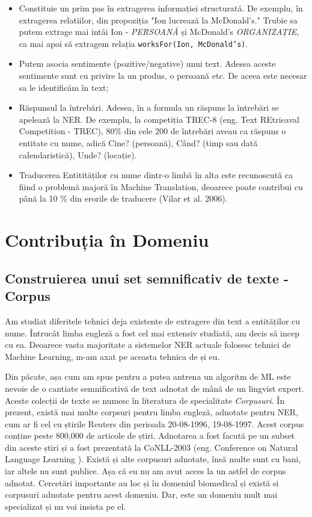 \begin{itemize}
\item Constituie un prim pas în extragerea informației structurată. De exemplu, în extragerea relatiilor, din propoziția "Ion lucrează la McDonald's." Trubie sa putem extrage mai intâi Ion - \textit{PERSOANĂ} și McDonald's \textit{ORGANIZAȚIE}, ca mai apoi să extragem relația \texttt{worksFor(Ion, McDonald's)}.
\item Putem asocia sentimente (pozitive/negative) unui text. Adesea aceste sentimente sunt cu privire la un produs, o persoană etc. De aceea este necesar sa le identificăm în text;
\item Răspunsul la întrebări. Adesea, în a formula un răspuns la întrebări se apelează la NER. De exemplu, la competiția TREC-8 (eng. Text REtrieaval Competition - TREC), 80\% din cele 200 de întrebări aveau ca răspuns o entitate cu nume, adică Cine? (persoană), Când? (timp sau dată calendaristică), Unde? (locație).\cite{trec8}
\item Traducerea Entitităților cu nume dintr-o limbă în alta este recunoscută ca fiind o problemă majoră în Machine Translation, deoarece poate contribui cu până la 10 \% din erorile de traducere (Vilar et al. 2006).\cite{vilar2006}
\end{itemize}

\section{Contribuția în Domeniu}

\subsection{Construierea unui set semnificativ de texte - Corpus}
Am studiat diferitele tehnici deja existente de extragere din text a entităților cu nume. Întrucât limba engleză a fost cel mai extensiv studiată, am decis să incep cu ea. Deoarece vasta majoritate a sistemelor NER actuale folosesc tehnici de Machine Learning, m-am axat pe aceasta tehnica de și eu.

Din păcate, așa cum am spus pentru a putea antrena un algoritm de ML este nevoie de o cantiate semnificativă de text adnotat de mână de un lingvist expert. Aceste colecții de texte se numesc în literatura de specialitate \textit{Corpusuri}. În prezent, există mai multe corpsuri pentru limba engleză, adnotate pentru NER, cum ar fi cel cu știrile Reuters din perioada 20-08-1996, 19-08-1997.\cite{rcv1} Acest corpus conține peste 800,000 de articole de știri. Adnotarea a fost facută pe un subset din aceste știri și a fost prezentată la CoNLL-2003\cite{conll2003} (eng. Conference on Natural Language Learning ). Există și alte corpusuri adnotate, însă multe sunt cu bani, iar altele nu sunt publice. Așa că eu nu am avut acces la un astfel de corpus adnotat. Cercetări importante au loc și în domeniul biomedical și există si corpusuri adnotate pentru acest domeniu. Dar, este un domeniu mult mai specializat și nu voi insista pe el.


